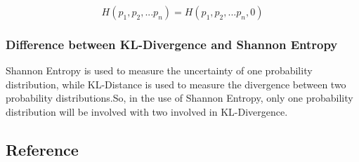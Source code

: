 \documentclass[
]{article}
\begin{document}
\[H(p_1,p_2,...p_n)=H(p_1,p_2,...p_n,0)\]

\hypertarget{difference-between-kl-divergence-and-shannon-entropy}{%
\subsubsection{Difference between KL-Divergence and Shannon
Entropy}\label{difference-between-kl-divergence-and-shannon-entropy}}

Shannon Entropy is used to measure the uncertainty of one probability
distribution, while KL-Distance is used to measure the divergence
between two probability distributions.So, in the use of Shannon Entropy,
only one probability distribution will be involved with two involved in
KL-Divergence.

\hypertarget{reference}{%
\subsection{Reference}\label{reference}}
\end{document}
